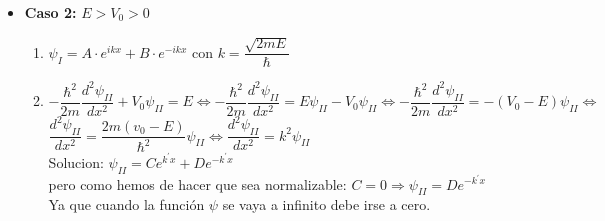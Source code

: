 \documentclass{report}
\begin{document}
{\begin{itemize}
                  Sabemos que clásicamente $R=0$ y que $T=1$, pero en el caso cuántico no sucede
                  así ya que existe cierta probabilidad de que exista reflexión aunque la partícula
                  tenga una energía superior a la del pozo/pared.

                  R en función de la energía: $R=\dfrac{4mE-2mU-4m\sqrt{E(E-U)}}{4mE-2mU+4m\sqrt{E(E-U)}}$

                  La representación de $R$ con $T$ es interesante: %
            \item \textbf{Caso 2:} $E>V_0>0$
            
                  \begin{enumerate}
                    \item $\psi_I=A\cdot e^{ikx}+B\cdot e^{-ikx}$ con $k=\dfrac{\sqrt{2mE}}{\hbar}$\\
                    
                    \item $-\dfrac{\hbar^2}{2m}\dfrac{d^2\psi_{II}}{dx^2}+V_0\psi_{II}=E\Longleftrightarrow
                          -\dfrac{\hbar^2}{2m}\dfrac{d^2\psi_{II}}{dx^2}=E\psi_{II}-V_0\psi_{II}\Longleftrightarrow
                          -\dfrac{\hbar^2}{2m}\dfrac{d^2\psi_{II}}{dx^2}=-(V_0-E)\psi_{II}\Longleftrightarrow$ \\
                          
                          $\dfrac{d^2\psi_{II}}{dx^2}=\dfrac{2m(v_0-E)}{\hbar^2}\psi_{II}\Longleftrightarrow
                          \dfrac{d^2\psi_{II}}{dx^2}=k^2\psi_{II}$\\

                          Solucion: $\psi_{II}=Ce^{k^\prime x}+De^{-k^\prime x}$\\
                          pero como hemos de hacer que sea normalizable: $C=0\Longrightarrow \psi_{II}=De^{-k^\prime x}$
                          Ya que cuando la función $\psi$ se vaya a infinito debe irse a cero.
                  \end{enumerate}
        \end{itemize}
        }
\end{document}
